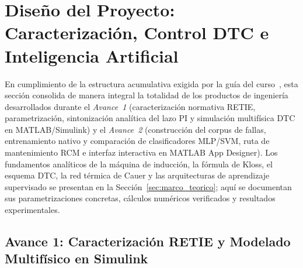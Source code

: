 \section{Diseño del Proyecto: Caracterización, Control DTC e Inteligencia Artificial}\label{sec:diseno_avances}

En cumplimiento de la estructura acumulativa exigida por la guía del curso~\cite{GuiaProyecto2026}, esta sección consolida de manera integral la totalidad de los productos de ingeniería desarrollados durante el \emph{Avance~1} (caracterización normativa RETIE, parametrización, sintonización analítica del lazo PI y simulación multifísica DTC en MATLAB/Simulink) y el \emph{Avance~2} (construcción del corpus de fallas, entrenamiento nativo y comparación de clasificadores MLP/SVM, ruta de mantenimiento RCM e interfaz interactiva en MATLAB App Designer). Los fundamentos analíticos de la máquina de inducción, la fórmula de Kloss, el esquema DTC, la red térmica de Cauer y las arquitecturas de aprendizaje supervisado se presentan en la Sección~\ref{sec:marco_teorico}; aquí se documentan sus parametrizaciones concretas, cálculos numéricos verificados y resultados experimentales.

\subsection{Avance 1: Caracterización RETIE y Modelado Multifísico en Simulink}\label{subsec:avance1}

